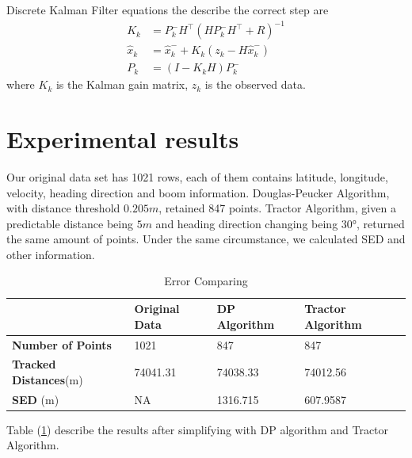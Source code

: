 Discrete Kalman Filter equations the describe the correct step are
\begin{align*}
K_k&=P_k^-H^\top (HP_k^-H^\top+R)^{-1} \\
\hat{x}_k&=\hat{x}_k^-+K_k(z_k-H\hat{x}_k^-) \\
P_k&=(I-K_kH)P_k^-
\end{align*}
where $K_k$ is the Kalman gain matrix, $z_k$ is the observed data.

\section{Experimental  results}

Our original data set has 1021 rows, each of them contains latitude, longitude, velocity, heading direction and boom information. Douglas-Peucker Algorithm, with distance threshold $0.205m$, retained 847 points. Tractor Algorithm, given a predictable distance being $5m$ and heading direction changing being $\ang{30}$, returned the same amount of points. Under the same circumstance, we calculated SED and other information.

\begin{table}[h]
\centering
\caption{Error Comparing}
\label{tabledist}
\begin{tabular}{|l|l|l|l|}
\hline 
  & \textbf{Original Data} & \textbf{DP Algorithm} & \textbf{Tractor Algorithm}  \\
\hline 
\textbf{Number of Points} & 1021              & 847         & 847         \\
\textbf{Tracked Distances}(m)  & 74041.31     & 74038.33    & 74012.56     \\
\textbf{SED} (m)    & NA        & 1316.715    & 607.9587   \\
\hline 
\end{tabular}
\end{table}

Table (\ref{tabledist}) describe the results after simplifying with DP algorithm and Tractor Algorithm.

